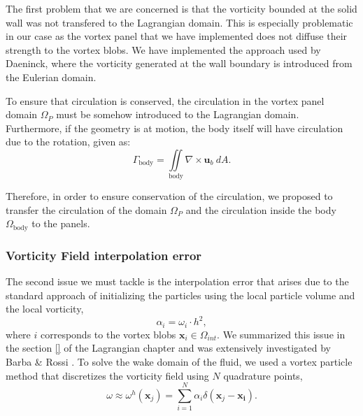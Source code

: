 


The first problem that we are concerned is that the vorticity bounded at the solid wall was not transfered to the Lagrangian domain. This is especially problematic in our case as the vortex panel that we have implemented does not diffuse their strength to the vortex blobs. We have implemented the approach used by Daeninck, where the vorticity generated at the wall boundary is introduced from the Eulerian domain. 

To ensure that circulation is conserved, the circulation in the vortex panel domain $\Omega_P$ must be somehow introduced to the Lagrangian domain. Furthermore, if the geometry is at motion, the body itself will have circulation due to the rotation, given as:
	\begin{equation}
	\Gamma_{\mathrm{body}} = \iint\limits_{\mathrm{body}} \nabla \times \mathbf{u}_b \ d A.
	\end{equation}

Therefore, in order to ensure conservation of the circulation, we proposed to transfer the circulation of the domain $\Omega_P$ and the circulation inside the body $\Omega_{\mathrm{body}}$ to the panels.


\subsubsection*{Vorticity Field interpolation error}
	
The second issue we must tackle is the interpolation error that arises due to the standard approach of initializing the particles using the local particle volume and the local vorticity,
	\begin{equation}
	\alpha_i = \omega_i\cdot{h^2},
	\end{equation}
where $i$ corresponds to the vortex blobs $\mathbf{x}_i \in \Omega_{int}$. We summarized this issue in the section \ref{} of the Lagrangian chapter and was extensively investigated by Barba \& Rossi \cite{Barba2010a}. To solve the wake domain of the fluid, we used a vortex particle method that discretizes the vorticity field using $N$ quadrature points,
\begin{equation}
\omega \approx \omega^h(\mathbf{x}_j) = \sum_{i=1}^N \alpha_i \delta(\mathbf{x}_j - \mathbf{x_i}).
\end{equation}

